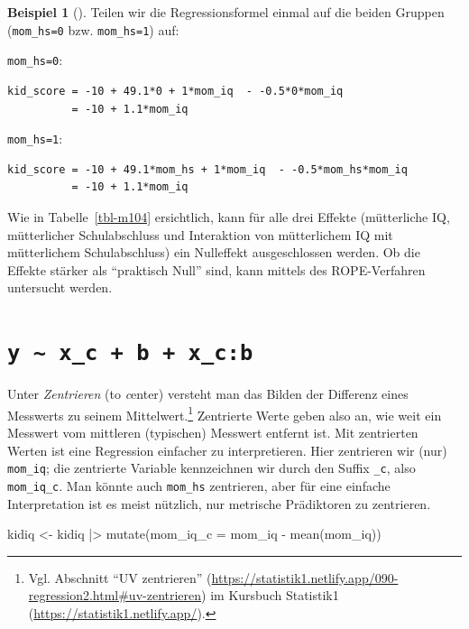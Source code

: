 \documentclass[
  ngerman,
  letterpaper,
  twoside,
  open=any]{scrbook}
\newenvironment{Shaded}{\begin{snugshade}}{\end{snugshade}}
\newcommand{\AttributeTok}[1]{\textcolor[rgb]{0.40,0.45,0.13}{#1}}
\newcommand{\FunctionTok}[1]{\textcolor[rgb]{0.28,0.35,0.67}{#1}}
\newcommand{\NormalTok}[1]{\textcolor[rgb]{0.00,0.23,0.31}{#1}}
\newcommand{\OtherTok}[1]{\textcolor[rgb]{0.00,0.23,0.31}{#1}}
\newcommand{\SpecialCharTok}[1]{\textcolor[rgb]{0.37,0.37,0.37}{#1}}
\theoremstyle{definition}
\newtheorem{example}{Beispiel}[chapter]
\theoremstyle{plain}
\theoremstyle{definition}
\theoremstyle{definition}
\theoremstyle{remark}
\begin{document}
\begin{example}[]
Teilen wir die Regressionsformel einmal auf die beiden Gruppen
(\texttt{mom\_hs=0} bzw. \texttt{mom\_hs=1}) auf:

\texttt{mom\_hs=0}:

\begin{verbatim}
kid_score = -10 + 49.1*0 + 1*mom_iq  - -0.5*0*mom_iq
          = -10 + 1.1*mom_iq
\end{verbatim}

\texttt{mom\_hs=1}:

\begin{verbatim}
kid_score = -10 + 49.1*mom_hs + 1*mom_iq  - -0.5*mom_hs*mom_iq
          = -10 + 1.1*mom_iq
\end{verbatim}

Wie in Tabelle~\ref{tbl-m104} ersichtlich, kann für alle drei Effekte
(mütterliche IQ, mütterlicher Schulabschluss und Interaktion von
mütterlichem IQ mit mütterlichem Schulabschluss) ein Nulleffekt
ausgeschlossen werden. Ob die Effekte stärker als \enquote{praktisch
Null} sind, kann mittels des ROPE-Verfahren untersucht werden.

\section{\texorpdfstring{\texttt{y\ \textasciitilde{}\ x\_c\ +\ b\ +\ x\_c:b}}{y \textasciitilde{} x\_c + b + x\_c:b}}\label{y-x_c-b-x_cb}

Unter \emph{Zentrieren} (to \emph{c}enter) versteht man das Bilden der
Differenz eines Messwerts zu seinem Mittelwert.\footnote{Vgl. Abschnitt
  \enquote{UV zentrieren}
  (\url{https://statistik1.netlify.app/090-regression2.html\#uv-zentrieren})
  im Kursbuch Statistik1 (\url{https://statistik1.netlify.app/}).}
Zentrierte Werte geben also an, wie weit ein Messwert vom mittleren
(typischen) Messwert entfernt ist. Mit zentrierten Werten ist eine
Regression einfacher zu interpretieren. Hier zentrieren wir (nur)
\texttt{mom\_iq}; die zentrierte Variable kennzeichnen wir durch den
Suffix \texttt{\_c}, also \texttt{mom\_iq\_c}. Man könnte auch
\texttt{mom\_hs} zentrieren, aber für eine einfache Interpretation ist
es meist nützlich, nur metrische Prädiktoren zu zentrieren.

\begin{Shaded}
\begin{Highlighting}[]
\NormalTok{kidiq }\OtherTok{\textless{}{-}}
\NormalTok{  kidiq }\SpecialCharTok{|\textgreater{}} 
  \FunctionTok{mutate}\NormalTok{(}\AttributeTok{mom\_iq\_c =}\NormalTok{ mom\_iq }\SpecialCharTok{{-}} \FunctionTok{mean}\NormalTok{(mom\_iq))}


\end{Highlighting}
\end{Shaded}
\end{example}
\end{document}
